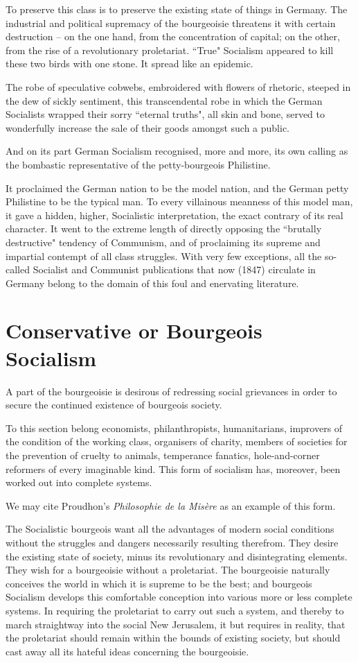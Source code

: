 To preserve this class is to preserve the existing state of things in Germany. The industrial and political supremacy of the bourgeoisie threatens it with certain destruction – on the one hand, from the concentration of capital; on the other, from the rise of a revolutionary proletariat. ``True" Socialism appeared to kill these two birds with one stone. It spread like an epidemic. 

The robe of speculative cobwebs, embroidered with flowers of rhetoric, steeped in the dew of sickly sentiment, this transcendental robe in which the German Socialists wrapped their sorry ``eternal truths", all skin and bone, served to wonderfully increase the sale of their goods amongst such a public.

And on its part German Socialism recognised, more and more, its own calling as the bombastic representative of the petty-bourgeois Philistine. 

It proclaimed the German nation to be the model nation, and the German petty Philistine to be the typical man. To every villainous meanness of this model man, it gave a hidden, higher, Socialistic interpretation, the exact contrary of its real character. It went to the extreme length of directly opposing the ``brutally destructive" tendency of Communism, and of proclaiming its supreme and impartial contempt of all class struggles. With very few exceptions, all the so-called Socialist and Communist publications that now (1847) circulate in Germany belong to the domain of this foul and enervating literature.

\section{Conservative or Bourgeois Socialism}

A part of the bourgeoisie is desirous of redressing social grievances in order to secure the continued existence of bourgeois society. 

To this section belong economists, philanthropists, humanitarians, improvers of the condition of the working class, organisers of charity, members of societies for the prevention of cruelty to animals, temperance fanatics, hole-and-corner reformers of every imaginable kind. This form of socialism has, moreover, been worked out into complete systems. 

We may cite Proudhon’s \emph{Philosophie de la Misère} as an example of this form. 

The Socialistic bourgeois want all the advantages of modern social conditions without the struggles and dangers necessarily resulting therefrom. They desire the existing state of society, minus its revolutionary and disintegrating elements. They wish for a bourgeoisie without a proletariat. The bourgeoisie naturally conceives the world in which it is supreme to be the best; and bourgeois Socialism develops this comfortable conception into various more or less complete systems. In requiring the proletariat to carry out such a system, and thereby to march straightway into the social New Jerusalem, it but requires in reality, that the proletariat should remain within the bounds of existing society, but should cast away all its hateful ideas concerning the bourgeoisie. 

